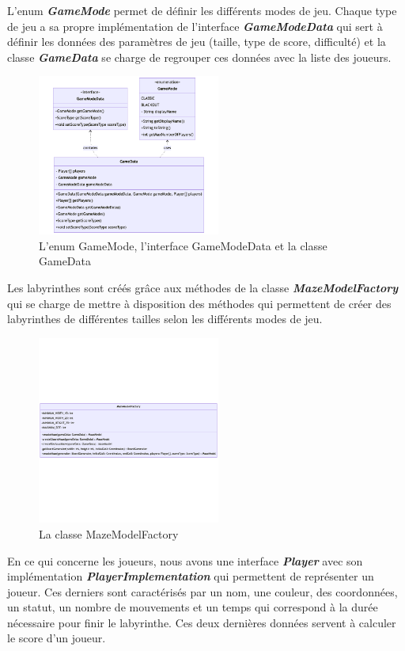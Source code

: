 L'enum \textbf{\textit{GameMode}} permet de définir les différents modes de
jeu. Chaque type de jeu a sa propre implémentation de l'interface
\textbf{\textit{GameModeData}} qui sert à définir les données des paramètres de
jeu (taille, type de score, difficulté) et la classe \textbf{\textit{GameData}}
se charge de regrouper ces données avec la liste des joueurs.

\begin{figure}[h!]
    \centering
    \includegraphics[width=6cm]{ressources/Implementation/Labyrinthe/Modele/GameData.png}
    \caption{L'enum GameMode, l'interface GameModeData et la classe GameData}
    \label{fig:GameDataAndElse}
\end{figure}


Les labyrinthes sont créés grâce aux méthodes de la classe
\textbf{\textit{MazeModelFactory}} qui se charge de mettre à disposition des
méthodes qui permettent de créer des labyrinthes de différentes tailles selon
les différents modes de jeu.

\begin{figure}[h!]
    \centering
    \includegraphics[width=6cm]{ressources/Implementation/Labyrinthe/Modele/MazeModelFactory.png}
    \caption{La classe MazeModelFactory}
    \label{fig:MazeModelFactory}
\end{figure}

En ce qui concerne les joueurs, nous avons une interface
\textbf{\textit{Player}} avec son implémentation
\textbf{\textit{PlayerImplementation}} qui permettent de représenter un joueur.
Ces derniers sont caractérisés par un nom, une couleur, des coordonnées, un
statut, un nombre de mouvements et un temps qui correspond à la durée nécessaire pour
finir le labyrinthe. Ces deux dernières données servent à calculer le score
d'un joueur.

